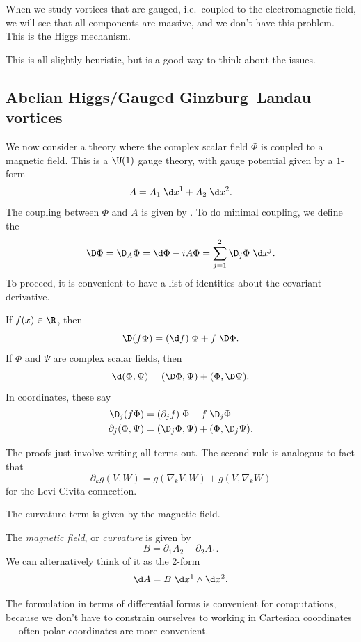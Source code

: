 \documentclass[a4paper]{article}
\begin{document}
When we study vortices that are gauged, i.e.\ coupled to the electromagnetic field, we will see that all components are massive, and we don't have this problem. This is the Higgs mechanism.

This is all slightly heuristic, but is a good way to think about the issues.

\subsection{Abelian Higgs/Gauged Ginzburg--Landau vortices}
We now consider a theory where the complex scalar field $\Phi$ is coupled to a magnetic field. This is a $\U(1)$ gauge theory, with gauge potential given by a $1$-form
\[
  A = A_1 \;\d x^1 + A_2 \;\d x^2.
\]
The coupling between $\Phi$ and $A$ is given by . To do minimal coupling, we define the \index{$\D$}
\[
  \D \Phi = \D_A \Phi = \d \Phi - i A \Phi = \sum_{j = 1}^2 \D_j \Phi \;\d x^j.
\]
To proceed, it is convenient to have a list of identities about the covariant derivative.
\begin{prop}
  If $f(x) \in \R$, then
  \[
    \D (f \Phi) = (\d f) \; \Phi + f\;\D \Phi.
  \]
  If $\Phi$ and $\Psi$ are complex scalar fields, then
  \[
    \d (\Phi, \Psi) = (\D \Phi, \Psi) + (\Phi, \D \Psi).
  \]
  In coordinates, these say
  \begin{align*}
    \D_j (f \Phi) &= (\partial_j f)\;\Phi + f\; \D_j \Phi\\
    \partial_j (\Phi, \Psi) &= (\D_j \Phi, \Psi) + (\Phi, \D_j \Psi).
  \end{align*}
\end{prop}
The proofs just involve writing all terms out. The second rule is analogous to fact that
\[
  \partial_k g(V, W) = g(\nabla_k V, W) + g(V, \nabla_k W)
\]
for the Levi-Civita connection.

The curvature term is given by the magnetic field.
\begin{defi}
  The \emph{magnetic field}, or \emph{curvature} is given by
  \[
    B = \partial_1 A_2 - \partial_2 A_1.
  \]
  We can alternatively think of it as the 2-form
  \[
    \d A = B \;\d x^1 \wedge\d x^2.
  \]
\end{defi}
The formulation in terms of differential forms is convenient for computations, because we don't have to constrain ourselves to working in Cartesian coordinates --- often polar coordinates are more convenient.
\end{document}

